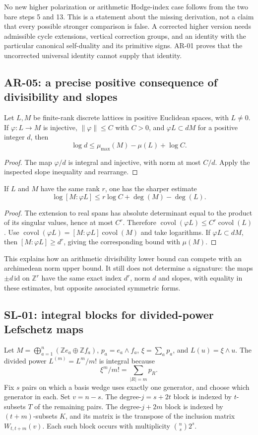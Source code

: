 \documentclass[11pt,a4paper]{article}
\theoremstyle{remark}
\begin{document}
No new higher polarization or arithmetic Hodge-index case follows from the
two bare steps 5 and 13.  This is a statement about the missing derivation,
not a claim that every possible stronger comparison is false.  A corrected
higher version needs admissible cycle extensions, vertical correction
groups, and an identity with the particular canonical self-duality and its
primitive signs.  AR-01 proves that the uncorrected universal identity
cannot supply that identity.

\subsection{AR-05: a precise positive consequence of divisibility and slopes}
\label{ar:divisibility-slope}

Let $L,M$ be finite-rank discrete lattices in positive Euclidean spaces,
with $L\ne0$.  If $\varphi:L\to M$ is injective, $\|\varphi\|\le C$
with $C>0$, and
$\varphi L\subset dM$ for a positive integer $d$, then
\[
 \log d\le\mu_{\max}(M)-\mu(L)+\log C.
\]
\begin{proof}
The map $\varphi/d$ is integral and injective, with norm at most $C/d$.
Apply the inspected slope inequality and rearrange.
\end{proof}
If $L$ and $M$ have the same rank $r$, one has the sharper estimate
\[
 \log[M:\varphi L]\le r\log C+\deg(M)-\deg(L).
\]
\begin{proof}
The extension to real spans has absolute determinant equal to the product
of its singular values, hence at most $C^r$.  Therefore
$\operatorname{covol}(\varphi L)\le C^r\operatorname{covol}(L)$.
Use $\operatorname{covol}(\varphi L)=[M:\varphi L]\operatorname{covol}(M)$
and take logarithms.  If $\varphi L\subset dM$, then
$[M:\varphi L]\ge d^r$, giving the corresponding bound with $\mu(M)$.
\end{proof}
This explains how an arithmetic divisibility lower bound can compete with
an archimedean norm upper bound.  It still does not determine a signature:
the maps $\pm d\,\mathrm{id}$ on $\mathbb Z^r$ have the same exact
index $d^r$, norm $d$ and slopes, with equality in these estimates, but
opposite associated symmetric forms.

\subsection{SL-01: integral blocks for divided-power Lefschetz maps}
\label{sl:blocks}

Let $M=\bigoplus_{a=1}^n(\mathbb Ze_a\oplus\mathbb Zf_a)$,
$p_a=e_a\wedge f_a$, $\xi=\sum_a p_a$, and $L(u)=\xi\wedge u$.
The divided power $L^{(m)}=L^m/m!$ is integral because
\[
 \xi^m/m!=\sum_{|R|=m}p_R.
\]
Fix $s$ pairs on which a basis wedge uses exactly one generator, and choose
which generator in each.  Set $v=n-s$.  The degree-$j=s+2t$ block is
indexed by $t$-subsets $T$ of the remaining pairs.  The degree-$j+2m$ block
is indexed by $(t+m)$-subsets $K$, and its matrix is the transpose of the
inclusion matrix $W_{t,t+m}(v)$.  Each such block occurs with multiplicity
$\binom ns2^s$.
\end{document}
